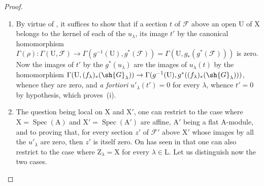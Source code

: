 \begin{proof}
\begin{enumerate}[label=(\roman*)]
  \item By virtue of , it suffices to show that if a section $t$ of $\mathscr{F}$ above an open $\mathrm{U}$ of $\mathrm{X}$ belongs to the kernel of each of the $u_\lambda$, its image $t'$ by the canonical homomorphism $\Gamma(\rho):\Gamma(\mathrm{U},\mathscr{F})\to\Gamma(g^{-1}(\mathrm{U}),g^*(\mathscr{F}))=\Gamma(\mathrm{U},g_*(g^*(\mathscr{F})))$ is zero.
  Now the images of $t'$ by the $g^*(u_\lambda)$ are the images of $u_\lambda(t)$ by the homomorphism $\Gamma(\mathrm{U},(f_\lambda)_*(\sh{G}_\lambda))\to\Gamma(g^{-1}(\mathrm{U}),g^*((f_\lambda)_*(\sh{G}_\lambda)))$, whence they are zero, and \emph{a fortiori} $u'_\lambda(t')=0$ for every $\lambda$, whence $t'=0$ by hypothesis, which proves~(i).

  \item The question being local on $\mathrm{X}$ and $\mathrm{X}'$, one can restrict to the case where $\mathrm{X}=\operatorname{Spec}(\mathrm{A})$ and $\mathrm{X}'=\operatorname{Spec}(\mathrm{A}')$ are affine, $\mathrm{A}'$ being a flat $\mathrm{A}$-module, and to proving that, for every section $z'$ of $\mathscr{F}'$ above $\mathrm{X}'$ whose images by all the $u'_\lambda$ are zero, then $z'$ is itself zero.
  On has seen in  that one can also restrict to the case where $\mathrm{Z}_\lambda=\mathrm{X}$ for every $\lambda\in\mathrm{L}$.
  Let us distinguish now the two cases.
  \medskip


\end{enumerate}
\end{proof}
